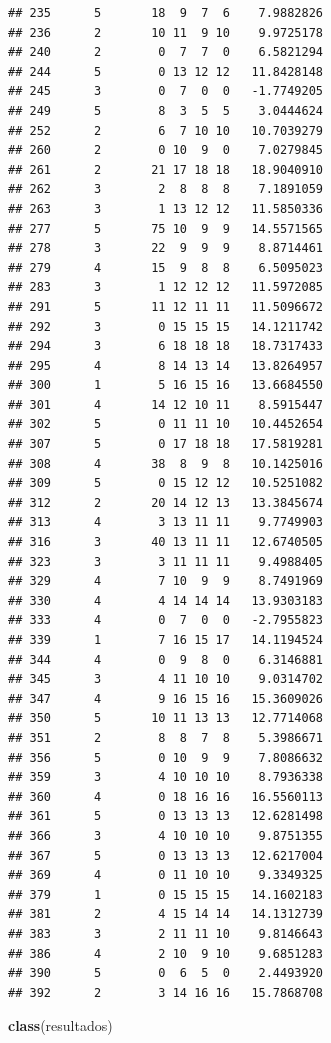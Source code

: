 \documentclass[
]{article}
\newenvironment{Shaded}{\begin{snugshade}}{\end{snugshade}}
\newcommand{\KeywordTok}[1]{\textcolor[rgb]{0.13,0.29,0.53}{\textbf{#1}}}
\newcommand{\NormalTok}[1]{#1}
\begin{document}
\begin{verbatim}
## 235      5       18  9  7  6    7.9882826
## 236      2       10 11  9 10    9.9725178
## 240      2        0  7  7  0    6.5821294
## 244      5        0 13 12 12   11.8428148
## 245      3        0  7  0  0   -1.7749205
## 249      5        8  3  5  5    3.0444624
## 252      2        6  7 10 10   10.7039279
## 260      2        0 10  9  0    7.0279845
## 261      2       21 17 18 18   18.9040910
## 262      3        2  8  8  8    7.1891059
## 263      3        1 13 12 12   11.5850336
## 277      5       75 10  9  9   14.5571565
## 278      3       22  9  9  9    8.8714461
## 279      4       15  9  8  8    6.5095023
## 283      3        1 12 12 12   11.5972085
## 291      5       11 12 11 11   11.5096672
## 292      3        0 15 15 15   14.1211742
## 294      3        6 18 18 18   18.7317433
## 295      4        8 14 13 14   13.8264957
## 300      1        5 16 15 16   13.6684550
## 301      4       14 12 10 11    8.5915447
## 302      5        0 11 11 10   10.4452654
## 307      5        0 17 18 18   17.5819281
## 308      4       38  8  9  8   10.1425016
## 309      5        0 15 12 12   10.5251082
## 312      2       20 14 12 13   13.3845674
## 313      4        3 13 11 11    9.7749903
## 316      3       40 13 11 11   12.6740505
## 323      3        3 11 11 11    9.4988405
## 329      4        7 10  9  9    8.7491969
## 330      4        4 14 14 14   13.9303183
## 333      4        0  7  0  0   -2.7955823
## 339      1        7 16 15 17   14.1194524
## 344      4        0  9  8  0    6.3146881
## 345      3        4 11 10 10    9.0314702
## 347      4        9 16 15 16   15.3609026
## 350      5       10 11 13 13   12.7714068
## 351      2        8  8  7  8    5.3986671
## 356      5        0 10  9  9    7.8086632
## 359      3        4 10 10 10    8.7936338
## 360      4        0 18 16 16   16.5560113
## 361      5        0 13 13 13   12.6281498
## 366      3        4 10 10 10    9.8751355
## 367      5        0 13 13 13   12.6217004
## 369      4        0 11 10 10    9.3349325
## 379      1        0 15 15 15   14.1602183
## 381      2        4 15 14 14   14.1312739
## 383      3        2 11 11 10    9.8146643
## 386      4        2 10  9 10    9.6851283
## 390      5        0  6  5  0    2.4493920
## 392      2        3 14 16 16   15.7868708
\end{verbatim}

\begin{Shaded}
\begin{Highlighting}[]
\KeywordTok{class}\NormalTok{(resultados)}
\end{Highlighting}
\end{Shaded}
\end{document}
